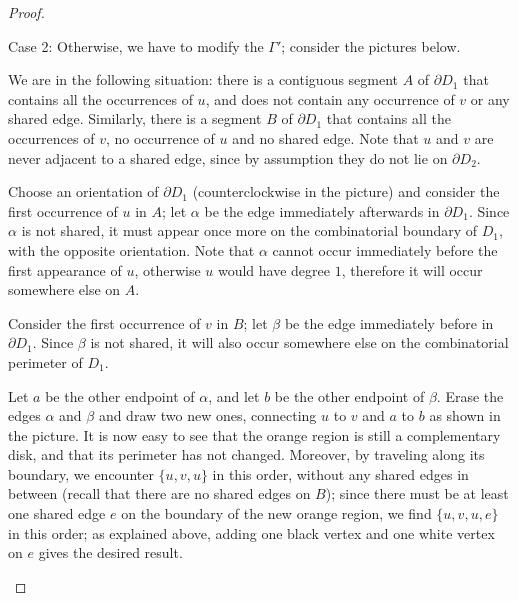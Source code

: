 \begin{proof}
\begin{sideline}{Case 2:}
Otherwise, we have to modify the \dessin{} $\Gamma'$; consider the pictures below.
\begin{enumarabic}
\item We are in the following situation: there is a contiguous segment $A$ of $\partial D_1$ that contains all the occurrences of $u$, and does not contain any occurrence of $v$ or any shared edge. Similarly, there is a segment $B$ of $\partial D_1$ that contains all the occurrences of $v$, no occurrence of $u$ and no shared edge. Note that $u$ and $v$ are never adjacent to a shared edge, since by assumption they do not lie on $\partial D_2$.
\item Choose an orientation of $\partial D_1$ (counterclockwise in the picture) and consider the first occurrence of $u$ in $A$; let $\alpha$ be the edge immediately afterwards in $\partial D_1$. Since $\alpha$ is not shared, it must appear once more on the combinatorial boundary of $D_1$, with the opposite orientation. Note that $\alpha$ cannot occur immediately before the first appearance of $u$, otherwise $u$ would have degree $1$, therefore it will occur somewhere else on $A$.
\item Consider the first occurrence of $v$ in $B$; let $\beta$ be the edge immediately before in $\partial D_1$. Since $\beta$ is not shared, it will also occur somewhere else on the combinatorial perimeter of $D_1$.
\item Let $a$ be the other endpoint of $\alpha$, and let $b$ be the other endpoint of $\beta$. Erase the edges $\alpha$ and $\beta$ and draw two new ones, connecting $u$ to $v$ and $a$ to $b$ as shown in the picture. It is now easy to see that the orange region is still a complementary disk, and that its perimeter has not changed. Moreover, by traveling along its boundary, we encounter $\{u,v,u\}$ in this order, without any shared edges in between (recall that there are no shared edges on $B$); since there must be at least one shared edge $e$ on the boundary of the new orange region, we find $\{u,v,u,e\}$ in this order; as explained above, adding one black vertex and one white vertex on $e$ gives the desired result.
\end{enumarabic}
\def\picturesetupbase{
\path[use as bounding box] (2,1.4) rectangle (-2,-1.4);
\begin{pgfonlayer}{graph edge below}
\fill[disk 1,postaction={draw,surf boundary}] circle(1);
\end{pgfonlayer}
\path (120:1) pic{black vertex} node[above left] {$u$};
\path (210:1) pic{black vertex} node[left=3pt] {$u$};
}
\end{sideline}
\end{proof}

